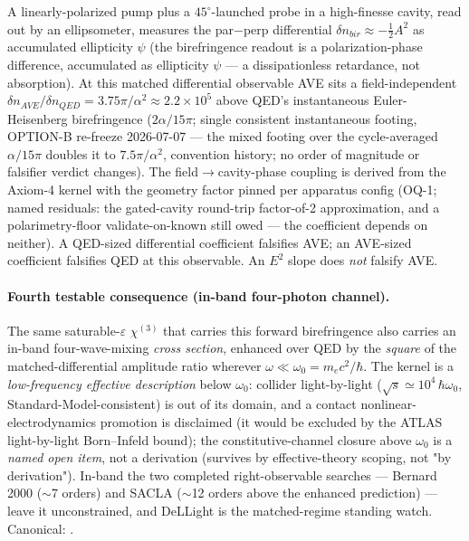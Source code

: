 A linearly-polarized pump plus a $45^\circ$-launched probe in a high-finesse cavity, read out by an ellipsometer, measures the par$-$perp differential $\delta n_{bir}\approx-\tfrac12 A^2$ as accumulated ellipticity $\psi$ (the birefringence readout is a polarization-phase difference, accumulated as ellipticity $\psi$ --- a dissipationless retardance, not absorption). At this matched differential observable AVE sits a field-independent $\delta n_{AVE}/\delta n_{QED}=3.75\pi/\alpha^2\approx2.2\times10^5$ above QED's instantaneous Euler-Heisenberg birefringence ($2\alpha/15\pi$; single consistent instantaneous footing, OPTION-B re-freeze 2026-07-07 --- the mixed footing over the cycle-averaged $\alpha/15\pi$ doubles it to $7.5\pi/\alpha^2$, convention history; no order of magnitude or falsifier verdict changes). The field$\to$cavity-phase coupling is derived from the Axiom-4 kernel with the geometry factor pinned per apparatus config (OQ-1; named residuals: the gated-cavity round-trip factor-of-2 approximation, and a polarimetry-floor validate-on-known still owed --- the coefficient depends on neither). A QED-sized differential coefficient falsifies AVE; an AVE-sized coefficient falsifies QED at this observable. An $E^2$ slope does \emph{not} falsify AVE.

\paragraph*{Fourth testable consequence (in-band four-photon channel).} The same saturable-$\varepsilon$ $\chi^{(3)}$ that carries this forward birefringence also carries an in-band four-wave-mixing \emph{cross section}, enhanced over QED by the \emph{square} of the matched-differential amplitude ratio wherever $\omega\ll\omega_0=m_ec^2/\hbar$. The kernel is a \emph{low-frequency effective description} below $\omega_0$: collider light-by-light ($\sqrt{s}\simeq10^4\,\hbar\omega_0$, Standard-Model-consistent) is out of its domain, and a contact nonlinear-electrodynamics promotion is disclaimed (it would be excluded by the ATLAS light-by-light Born--Infeld bound); the constitutive-channel closure above $\omega_0$ is a \emph{named open item}, not a derivation (survives by effective-theory scoping, not "by derivation"). In-band the two completed right-observable searches --- Bernard 2000 ($\sim$7 orders) and SACLA ($\sim$12 orders above the enhanced prediction) --- leave it unconstrained, and DeLLight is the matched-regime standing watch. Canonical: .

